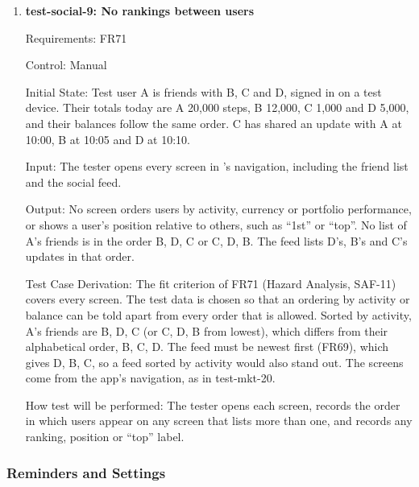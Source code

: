 \documentclass[12pt, titlepage]{article}
\begin{document}
\begin{enumerate}
Output: $U$ is no longer in B's or C's feed, and B's request for $U$ is
refused.

Test Case Derivation: The fit criterion of FR70 is that a deleted update no
longer appears in any friend's feed, so both friends it was shared with are
checked. The direct request checks that the update was removed and not only
hidden from feeds.

How test will be performed: A pytest test deletes $U$ as A, reads B's and
C's feeds, and sends B's request.

\item{\textbf{test-social-9: No rankings between users}\\}

Requirements: FR71

Control: Manual

Initial State: Test user A is friends with B, C and D, signed in on a test
device. Their totals today are A 20,000 steps, B 12,000, C 1,000 and D 5,000,
and their balances follow the same order. C has shared an update with A at
10:00, B at 10:05 and D at 10:10.

Input: The tester opens every screen in \progname{}'s navigation, including
the friend list and the social feed.

Output: No screen orders users by activity, currency or portfolio
performance, or shows a user's position relative to others, such as ``1st''
or ``top''. No list of A's friends is in the order B, D, C or C, D, B. The
feed lists D's, B's and C's updates in that order.

Test Case Derivation: The fit criterion of FR71 (Hazard Analysis, SAF-11)
covers every screen. The test data is chosen so that an ordering by activity
or balance can be told apart from every order that is allowed. Sorted by
activity, A's friends are B, D, C (or C, D, B from lowest), which differs from
their alphabetical order, B, C, D. The feed must be newest first (FR69), which
gives D, B, C, so a feed sorted by activity would also stand out. The screens
come from the app's navigation, as in test-mkt-20.

How test will be performed: The tester opens each screen, records the order
in which users appear on any screen that lists more than one, and records any
ranking, position or ``top'' label.

\end{enumerate}

\subsubsection{Reminders and Settings}
\end{document}
